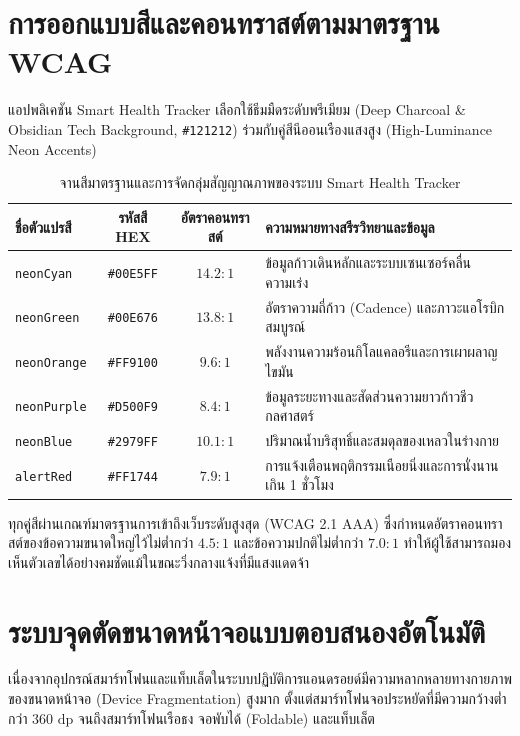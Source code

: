 \section{การออกแบบสีและคอนทราสต์ตามมาตรฐาน WCAG}
แอปพลิเคชัน Smart Health Tracker เลือกใช้ธีมมืดระดับพรีเมียม (Deep Charcoal \& Obsidian Tech Background, \texttt{\#121212}) ร่วมกับคู่สีนีออนเรืองแสงสูง (High-Luminance Neon Accents)

\begin{table}[H]
\centering
\caption{จานสีมาตรฐานและการจัดกลุ่มสัญญาณภาพของระบบ Smart Health Tracker}
\label{tab:color_palette}
\small
\begin{tabularx}{\textwidth}{|l|c|c|X|}
\toprule
\textbf{ชื่อตัวแปรสี} & \textbf{รหัสสี HEX} & \textbf{อัตราคอนทราสต์} & \textbf{ความหมายทางสรีรวิทยาและข้อมูล} \\
\midrule
\texttt{neonCyan} & \texttt{\#00E5FF} & $14.2:1$ & ข้อมูลก้าวเดินหลักและระบบเซนเซอร์คลื่นความเร่ง \\
\texttt{neonGreen} & \texttt{\#00E676} & $13.8:1$ & อัตราความถี่ก้าว (Cadence) และภาวะแอโรบิกสมบูรณ์ \\
\texttt{neonOrange} & \texttt{\#FF9100} & $9.6:1$ & พลังงานความร้อนกิโลแคลอรีและการเผาผลาญไขมัน \\
\texttt{neonPurple} & \texttt{\#D500F9} & $8.4:1$ & ข้อมูลระยะทางและสัดส่วนความยาวก้าวชีวกลศาสตร์ \\
\texttt{neonBlue} & \texttt{\#2979FF} & $10.1:1$ & ปริมาณน้ำบริสุทธิ์และสมดุลของเหลวในร่างกาย \\
\texttt{alertRed} & \texttt{\#FF1744} & $7.9:1$ & การแจ้งเตือนพฤติกรรมเนือยนิ่งและการนั่งนานเกิน 1 ชั่วโมง \\
\bottomrule
\end{tabularx}
\end{table}

ทุกคู่สีผ่านเกณฑ์มาตรฐานการเข้าถึงเว็บระดับสูงสุด (WCAG 2.1 AAA) ซึ่งกำหนดอัตราคอนทราสต์ของข้อความขนาดใหญ่ไว้ไม่ต่ำกว่า $4.5:1$ และข้อความปกติไม่ต่ำกว่า $7.0:1$ ทำให้ผู้ใช้สามารถมองเห็นตัวเลขได้อย่างคมชัดแม้ในขณะวิ่งกลางแจ้งที่มีแสงแดดจ้า

\section{ระบบจุดตัดขนาดหน้าจอแบบตอบสนองอัตโนมัติ}
เนื่องจากอุปกรณ์สมาร์ทโฟนและแท็บเล็ตในระบบปฏิบัติการแอนดรอยด์มีความหลากหลายทางกายภาพของขนาดหน้าจอ (Device Fragmentation) สูงมาก ตั้งแต่สมาร์ทโฟนจอประหยัดที่มีความกว้างต่ำกว่า $360\text{ dp}$ จนถึงสมาร์ทโฟนเรือธง จอพับได้ (Foldable) และแท็บเล็ต

